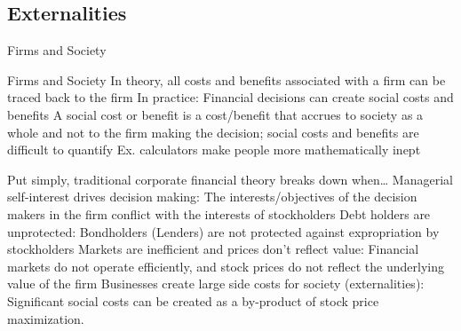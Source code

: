 \documentclass[10pt]{article}
\begin{document}
  \subsection{Externalities}


    \begin{core}{Firms and Society}

      Firms and Society
      In theory, all costs and benefits associated with a firm can be traced back to the firm
      In practice: Financial decisions can create social costs and benefits
      A social cost or benefit is a cost/benefit that accrues to society as a whole and not to the firm making the decision; social costs and benefits are difficult to quantify
      Ex. calculators make people more mathematically inept

      Put simply, traditional corporate financial theory breaks down when…
      Managerial self-interest drives decision making: The interests/objectives of the decision makers in the firm conflict with the interests of stockholders
      Debt holders are unprotected: Bondholders (Lenders) are not protected against expropriation by stockholders
      Markets are inefficient and prices don’t reflect value: Financial markets do not operate efficiently, and stock prices do not reflect the underlying value of the firm
      Businesses create large side costs for society (externalities): Significant social costs can be created as a by-product of stock price maximization.

    \end{core}
\end{document}
